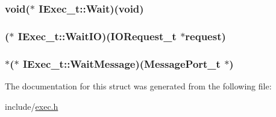 \hypertarget{structIExec__t_a04da5444df0680708bff66ed1dbea947}{
\subsubsection[{Wait}]{\setlength{\rightskip}{0pt plus 5cm}void($\ast$ I\+Exec\+\_\+t\+::\+Wait)(void)}}\label{structIExec__t_a04da5444df0680708bff66ed1dbea947}
\hypertarget{structIExec__t_a802bead383402b49d32965b5713e079f}{
\subsubsection[{Wait\+I\+O}]{($\ast$ I\+Exec\+\_\+t\+::\+Wait\+I\+O)({\bf I\+O\+Request\+\_\+t} $\ast$request)}}\label{structIExec__t_a802bead383402b49d32965b5713e079f}
\hypertarget{structIExec__t_aea77ea019cf4cffc6fb92f97c2d2eab9}{
\subsubsection[{Wait\+Message}]{$\ast$($\ast$ I\+Exec\+\_\+t\+::\+Wait\+Message)({\bf Message\+Port\+\_\+t} $\ast$)}}\label{structIExec__t_aea77ea019cf4cffc6fb92f97c2d2eab9}


The documentation for this struct was generated from the following file\+:\begin{DoxyCompactItemize}
\item 
include/\hyperlink{exec_8h}{exec.\+h}\end{DoxyCompactItemize}
